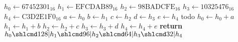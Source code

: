 \begin{algorithmic}[1]
\State $h_0\gets \textrm{67452301}_{16}$
\State $h_1\gets \textrm{EFCDAB89}_{16}$
\State $h_2\gets \textrm{98BADCFE}_{16}$
\State $h_3\gets \textrm{10325476}_{16}$
\State $h_4\gets \textrm{C3D2E1F0}_{16}$
\State $a\gets h_0$
\State $b\gets h_1$
\State $c\gets h_2$
\State $d\gets h_3$
\State $e\gets h_4$
\State todo
\State $h_0\gets h_0+a$
\State $h_1\gets h_1+b$
\State $h_2\gets h_2+c$
\State $h_3\gets h_3+d$
\State $h_4\gets h_4+e$
\EndFor
\State \textbf{return} $h_0\shlcmd128|h_1\shlcmd96|h_2\shlcmd64|h_3\shlcmd32|h_4$
\EndProcedure
\end{algorithmic}